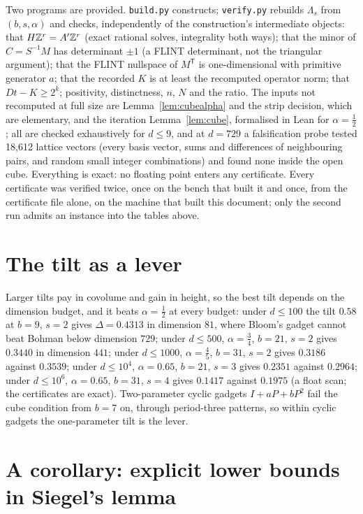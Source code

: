 \documentclass[11pt]{article}
\begin{document}
Two programs are provided. \texttt{build.py} constructs; \texttt{verify.py} rebuilds
$\Lambda_s$ from $(b,s,\alpha)$ and checks, independently of the construction's intermediate objects:
that $H\mathbb{Z}^r=A'\mathbb{Z}^r$ (exact rational solves, integrality both ways); that the minor of
$C=S^{-1}M$ has determinant $\pm1$ (a FLINT determinant, not the triangular argument);
that the FLINT nullspace of $M^{\mathsf T}$ is one-dimensional with primitive generator $a$;
that the recorded $K$ is at least the recomputed operator norm; that $Dt-K\ge2^k$;
positivity, distinctness, $n$, $N$ and the ratio. The inputs not recomputed at full
size are Lemma~\ref{lem:cubealpha} and the strip decision, which are elementary, and the iteration Lemma~\ref{lem:cube}, formalised in Lean for
$\alpha=\tfrac12$; all are checked exhaustively for $d\le9$, and at $d=729$ a falsification probe tested
18,612 lattice vectors (every basis vector, sums and differences of neighbouring pairs, and random
small integer combinations) and found none inside the open cube. Everything is exact: no floating
point enters any certificate. Every certificate was verified twice, once on the bench that built it and
once, from the certificate file alone, on the machine that built this document; only the second run admits
an instance into the tables above.

\section{The tilt as a lever}

Larger tilts pay in covolume and gain in height, so the best tilt depends on the dimension budget, and it beats $\alpha=\tfrac12$ at every budget: under $d\le100$ the tilt $0.58$ at $b=9$, $s=2$ gives $\Delta=0.4313$ in dimension $81$, where Bloom's gadget cannot beat Bohman below dimension $729$; under $d\le500$, $\alpha=\tfrac34$, $b=21$, $s=2$ gives $0.3440$ in dimension $441$; under $d\le1000$, $\alpha=\tfrac45$, $b=31$, $s=2$ gives $0.3186$ against $0.3539$; under $d\le10^4$, $\alpha=0.65$, $b=21$, $s=3$ gives $0.2351$ against $0.2964$; under $d\le10^6$, $\alpha=0.65$, $b=31$, $s=4$ gives $0.1417$ against $0.1975$ (a float scan; the certificates are exact). Two-parameter cyclic gadgets $I+aP+bP^2$ fail the cube condition from $b=7$ on, through period-three patterns, so within cyclic gadgets the one-parameter tilt is the lever.

\section{A corollary: explicit lower bounds in Siegel's lemma}
\end{document}
